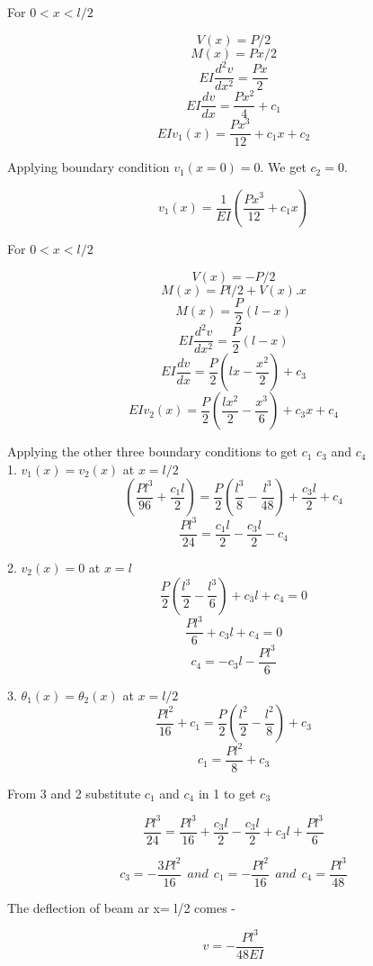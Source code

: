 \documentclass{report}
\begin{document}
\noindent
For \(0 < x <l/2\)

\[V(x) = P/2\]
\[M(x) = Px/2\]
\[ EI \frac{d^2v}{dx^2} = \frac{Px}{2} \] 
\[ EI \frac{dv}{dx} = \frac{Px^2}{4} + c_1 \] 
\[ EI v_1(x) = \frac{Px^3}{12} + c_1 x + c_2 \] 

Applying boundary condition \(v_1(x = 0) = 0 \). We get \(c_2 =0\).

\[ v_1(x) = \frac{1}{EI} \left( \frac{Px^3}{12} + c_1 x \right) \]

For \(0 < x <l/2\)

\[V(x) = -P/2 \] 
\[ M(x) = Pl/2 + V(x).x \] 
\[ M(x) = \frac{P}{2}(l-x) \]
\[ EI \frac{d^2v}{dx^2} = \frac{P}{2}(l-x)\]
\[ EI \frac{dv}{dx} = \frac{P}{2}\left(lx-\frac{x^2}{2}\right) + c_3\]
\[ EI v_2(x) = \frac{P}{2}\left(\frac{lx^2}{2}-\frac{x^3}{6}\right) + c_3 x + c_4\]

Applying the other three boundary conditions to get \(c_1\) \(c_3\) and \( c_4\)\\

1. \(v_1(x) = v_2(x)\) at \( x =l/2 \)
\[ \left( \frac{Pl^3}{96} + \frac{c_1l}{2}  \right) = \frac{P}{2}\left( \frac{l^3}{8} - \frac{l^3}{48}\right) + \frac{c_3l}{2} + c_4 \]
\[ \frac{Pl^3}{24} = \frac{c_1l}{2} - \frac{c_3l}{2} - c_4 \] 


2. \(v_2(x) =0\) at \(x=l \)
\[ \frac{P}{2}\left( \frac{l^3}{2} - \frac{l^3}{6}\right) + c_3 l + c_4= 0\]
\[ \frac{Pl^3}{6} + c_3 l + c_4= 0\]
\[ c_4 = -c_3l - \frac{Pl^3}{6} \]

3. \(\theta_1(x) = \theta_2(x)\) at \(x=l/2 \)
\[ \frac{Pl^2}{16} + c_1 = \frac{P}{2}\left( \frac{l^2}{2}- \frac{l^2}{8} \right) + c_3 \]
\[ c_1 = \frac{Pl^2}{8} + c_3 \]

From 3 and 2 substitute \(c_1\) and \(c_4\) in 1 to get \(c_3\)

\[ \frac{Pl^3}{24} = \frac{Pl^3}{16} + \frac{c_3l}{2} - \frac{c_3l}{2}+ c_3l + \frac{Pl^3}{6} \]

\begin{tcolorbox}[colback=pink!30!white, colframe=black, width=\textwidth, boxrule=0.5mm, sharp corners, left=1mm, right=1mm, top=1mm, bottom=1mm]
  \[ c_3 = -\frac{3Pl^2}{16} \ \ and \ \ c_1 = -\frac{Pl^2}{16} \ \ and \ \  c_4 = \frac{Pl^3}{48}\]
\end{tcolorbox}

The deflection of beam ar x= l/2 comes - 
\begin{tcolorbox}[colback=blue!20!white, colframe=black, width=\textwidth, boxrule=0.5mm, sharp corners, left=1mm, right=1mm, top=1mm, bottom=1mm]
  \[ v = -\frac{Pl^3}{48 EI} \]
\end{tcolorbox}
\end{document}
